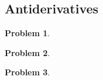 \documentclass{article}
\newtheorem{problem}{Problem}
\begin{document}
%
%

%
%

\subsection{Antiderivatives}\label{secMPSantiderivatives}
\begin{problem}

\end{problem}
\begin{problem}

\end{problem}
\begin{problem}

\end{problem}

%
%
%
%
%
\end{document}
